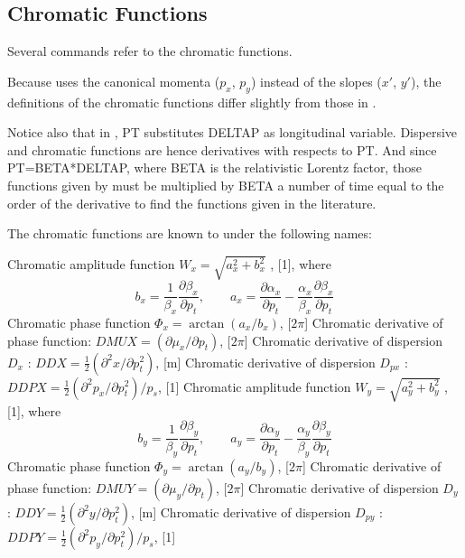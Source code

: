 \subsection{Chromatic Functions} 
\label{subsec:tables_chrom}
Several \madx commands refer to the chromatic functions. 

Because \madx uses the canonical momenta ($p_x$, $p_y$) instead of the
slopes ($x'$, $y'$), the definitions of the chromatic functions differ
slightly from those in \cite{Montague1979}.

Notice also that in \madx, PT substitutes DELTAP as longitudinal
variable. Dispersive and chromatic functions are hence derivatives with
respects to PT. 
And since PT=BETA*DELTAP, where BETA is the relativistic Lorentz 
factor, those functions given by \madx must be multiplied by BETA a
number of time equal to the order of the derivative to find the
functions given in the literature. 

The chromatic functions are known to \madx under the following names:

\begin{madlist}
   Chromatic amplitude function $W_x = \sqrt{a_x^2 + b_x^2}$ ,
         [1], where \\
         \[
         b_x = \frac{1}{\beta_x} \frac{\partial \beta_x}{\partial p_t}  ,\qquad
         a_x = \frac{\partial \alpha_x}{\partial p_t} -
         \frac{\alpha_x}{\beta_x}\frac{\partial \beta_x}{\partial p_t}
         \]
   Chromatic phase function $\Phi_x = \arctan (a_x / b_x)$, [$2 \pi$] 
   Chromatic derivative of phase function: 
  $DMUX = (\partial \mu_x / \partial p_t)$,  [$2 \pi$]
   Chromatic derivative of dispersion $D_x$ :  
  $DDX = \frac{1}{2} (\partial^2 x / \partial p_t^2)$, [m]     
   Chromatic derivative of dispersion $D_{px}$ : 
  $DDPX = \frac{1}{2} ( \partial^2 p_x / \partial p_t^2 ) / p_s $, [1]
   Chromatic amplitude function $W_y = \sqrt{a_y^2 + b_y^2}$ ,
         [1], where \\
         \[
         b_y = \frac{1}{\beta_y} \frac{\partial \beta_y}{\partial p_t} ,\qquad
         a_y = \frac{\partial \alpha_y}{\partial p_t} -
         \frac{\alpha_y}{\beta_y}\frac{\partial \beta_y}{\partial p_t}
         \]
   Chromatic phase function $\Phi_y = \arctan (a_y / b_y)$, [$2 \pi$]
   Chromatic derivative of phase function:
  $DMUY = (\partial \mu_y / \partial p_t)$,  [$2 \pi$] 
   Chromatic derivative of dispersion $D_y$ : 
  $DDY = \frac{1}{2} (\partial^2 y / \partial p_t^2)$, [m]      
   Chromatic derivative of dispersion $D_{py}$ : 
  $DDPY = \frac{1}{2} ( \partial^2 p_y / \partial p_t^2 ) / p_s $, [1] 
\end{madlist}

